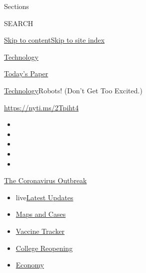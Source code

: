 Sections

SEARCH

\protect\hyperlink{site-content}{Skip to
content}\protect\hyperlink{site-index}{Skip to site index}

\href{https://www.nytimes.com/section/technology}{Technology}

\href{https://myaccount.nytimes.com/auth/login?response_type=cookie\&client_id=vi}{}

\href{https://www.nytimes.com/section/todayspaper}{Today's Paper}

\href{/section/technology}{Technology}\textbar{}Robots! (Don't Get Too
Excited.)

\url{https://nyti.ms/2Tpiht4}

\begin{itemize}
\item
\item
\item
\item
\item
\end{itemize}

\href{https://www.nytimes.com/news-event/coronavirus?action=click\&pgtype=Article\&state=default\&region=TOP_BANNER\&context=storylines_menu}{The
Coronavirus Outbreak}

\begin{itemize}
\tightlist
\item
  live\href{https://www.nytimes.com/2020/08/04/world/coronavirus-covid-19.html?action=click\&pgtype=Article\&state=default\&region=TOP_BANNER\&context=storylines_menu}{Latest
  Updates}
\item
  \href{https://www.nytimes.com/interactive/2020/us/coronavirus-us-cases.html?action=click\&pgtype=Article\&state=default\&region=TOP_BANNER\&context=storylines_menu}{Maps
  and Cases}
\item
  \href{https://www.nytimes.com/interactive/2020/science/coronavirus-vaccine-tracker.html?action=click\&pgtype=Article\&state=default\&region=TOP_BANNER\&context=storylines_menu}{Vaccine
  Tracker}
\item
  \href{https://www.nytimes.com/2020/08/02/us/covid-college-reopening.html?action=click\&pgtype=Article\&state=default\&region=TOP_BANNER\&context=storylines_menu}{College
  Reopening}
\item
  \href{https://www.nytimes.com/live/2020/08/03/business/stock-market-today-coronavirus?action=click\&pgtype=Article\&state=default\&region=TOP_BANNER\&context=storylines_menu}{Economy}
\end{itemize}

